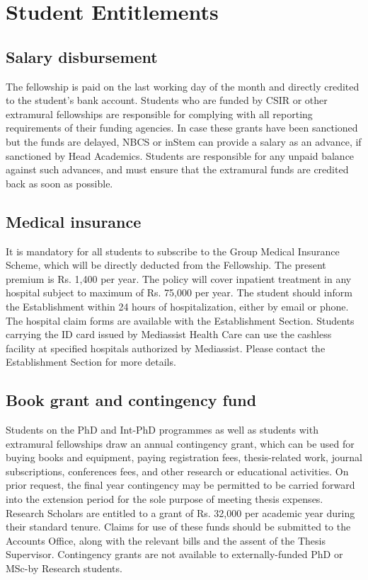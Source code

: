 \documentclass[a4paper,10pt]{article}
\begin{document}
\section{Student Entitlements}
\subsection{Salary disbursement}
The fellowship is paid on the last working day of the month and
directly credited to the student’s bank account. Students who are funded by CSIR or other
extramural fellowships are responsible for complying with all reporting requirements of
their funding agencies. In case these grants have been sanctioned but the funds are delayed,
NBCS or inStem can provide a salary as an advance, if sanctioned by Head Academics.
Students are responsible for any unpaid balance against such advances, and must ensure that
the extramural funds are credited back as soon as possible.

\subsection{Medical insurance}
It is mandatory for all students to subscribe to the Group Medical
Insurance Scheme, which will be directly deducted from the Fellowship. The present
premium is Rs. 1,400 per year. The policy will cover inpatient treatment in any hospital
subject to maximum of Rs. 75,000 per year. The student should inform the Establishment
within 24 hours of hospitalization, either by email or phone. The hospital claim forms are
available with the Establishment Section. Students carrying the ID card issued by Mediassist
Health Care can use the cashless facility at specified hospitals authorized by Mediassist.
Please contact the Establishment Section for more details.

\subsection{Book grant and contingency fund}
Students on the PhD and Int-PhD programmes as well
as students with extramural fellowships draw an annual contingency grant, which can be
used for buying books and equipment, paying registration fees, thesis-related work, journal
subscriptions, conferences fees, and other research or educational activities. On prior
request, the final year contingency may be permitted to be carried forward into the extension
period for the sole purpose of meeting thesis expenses. Research Scholars are entitled to a
grant of Rs. 32,000 per academic year during their standard tenure. Claims for use of these
funds should be submitted to the Accounts Office, along with the relevant bills and the
assent of the Thesis Supervisor. Contingency grants are not available to externally-funded
PhD or MSc-by Research students.
\end{document}
